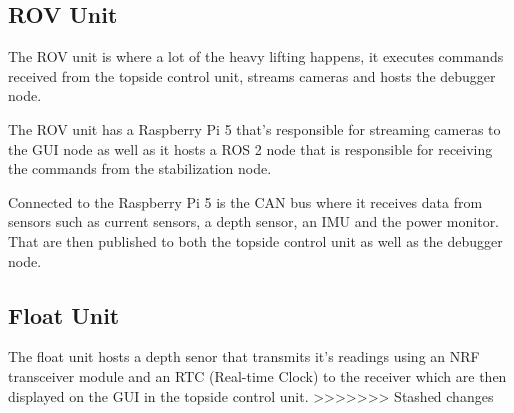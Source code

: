 \subsection{ROV Unit}
The ROV unit is where a lot of the heavy lifting happens, it executes commands received from the topside control unit, streams cameras and hosts the debugger node.

The ROV unit has a Raspberry Pi 5 that's responsible for streaming cameras to the GUI node as well as it hosts a ROS 2 node that is responsible for receiving the commands from the stabilization node.

Connected to the Raspberry Pi 5 is the CAN bus where it receives data from sensors such as current sensors, a depth sensor, an IMU and the power monitor.
That are then published to both the topside control unit as well as the debugger node.

\subsection{Float Unit}
The float unit hosts a depth senor that transmits it's readings using an NRF transceiver module and an RTC (Real-time Clock) to the receiver which are then displayed on the GUI in the topside control unit.
>>>>>>> Stashed changes
